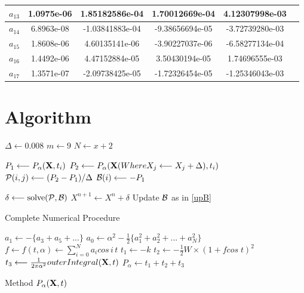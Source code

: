 \documentclass[10pt,a4paper,final]{report}
\begin{document}
\begin{tabular}{|c|c|c|c|c|c|}
\hline 
\rule[-1ex]{0pt}{2.5ex} $a_{13}$ & 1.0975e-06  &   1.85182586e-04 &  1.70012669e-04  & 4.12307998e-03\\ 
\hline 
\rule[-1ex]{0pt}{2.5ex} $a_{14}$ & 6.8963e-08  &  -1.03841883e-04   & -9.38656694e-05  & -3.72739280e-03   \\ 
\hline 
\rule[-1ex]{0pt}{2.5ex} $a_{15}$ & 1.8608e-06  &   4.60135141e-06 & -3.90227037e-06 & -6.58277134e-04\\ 
\hline 
\rule[-1ex]{0pt}{2.5ex} $a_{16}$ &  1.4492e-06  & 4.47152884e-05  & 3.50430194e-05   &  1.74696555e-03 \\ 
\hline 
\rule[-1ex]{0pt}{2.5ex} $a_{17}$ & 1.3571e-07 &  -2.09738425e-05 & -1.72326454e-05  & -1.25346043e-03 \\ 
\hline 
\end{tabular} 
		
\section{Algorithm}
\begin{algorithm}
\DontPrintSemicolon
{}
$\Delta \longleftarrow 0.008$ \; 
$m \longleftarrow 9$ \;
$N \longleftarrow x+2$ \; 
{
	$P_1\longleftarrow P_\alpha({\bf X}, t_i)$ \;	
	{
		$P_2 \longleftarrow P_\alpha({\bf X}(Where X_j \longleftarrow
		X_j + \Delta), t_i)$\; 
		${\cal P}(i,j) \longleftarrow (P_2 - P_1)/\Delta$\;
		}
	 ${\cal B}(i) \longleftarrow - P_1$ \; \label{upB} 

} 

{
	 \;
	$\delta \longleftarrow \text{solve}({\cal P},{\cal B})$ \;
	$X^{n+1} \longleftarrow X^{n} + \delta$ \;
	Update ${\cal B}$ as in \ref{upB}
}
\caption{Complete Numerical Procedure}
\end{algorithm}
\begin{algorithm}
\DontPrintSemicolon
{}
$a_1 \longleftarrow -\{a_3 + a_5 + ...\}$ \;
$a_0 \longleftarrow \alpha^2 - \frac{1}{2}\{a_1^2 + a_2^2+...+ a_N^2\}$ \;
$f \longleftarrow f(t,\alpha) \longleftarrow \sum_{i=0}^N a_i cos\,i\,t$ \;
$t_1 \longleftarrow -k$ \;
$t_2 \longleftarrow -\frac{1}{2} W \times (1 + f cos \; t)^2$ \;
$t_3 \longleftarrow \frac{1}{2\pi\alpha^2} outerIntegral({\bf X}, t)$ \; 
$P_\alpha \longleftarrow t_1 + t_2 + t_3$ \;
\caption{Method $P_\alpha({\bf X},t)$}
\end{algorithm}
\end{document}
